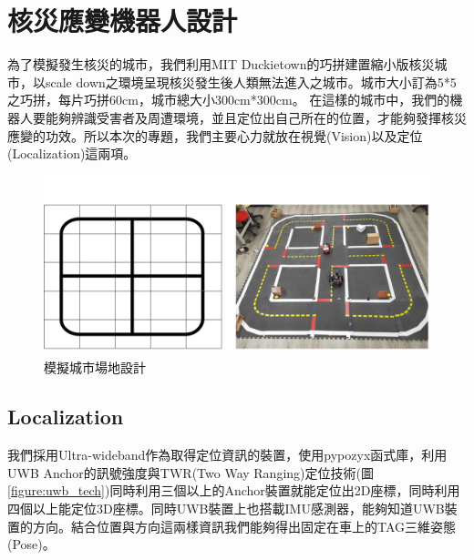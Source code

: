 \section{核災應變機器人設計}
為了模擬發生核災的城市，我們利用MIT Duckietown的巧拼建置縮小版核災城市，以scale down之環境呈現核災發生後人類無法進入之城市。城市大小訂為5*5之巧拼，每片巧拼60cm，城市總大小300cm*300cm。
在這樣的城市中，我們的機器人要能夠辨識受害者及周遭環境，並且定位出自己所在的位置，才能夠發揮核災應變的功效。所以本次的專題，我們主要心力就放在視覺(Vision)以及定位(Localization)這兩項。

\begin{figure}[t]
  \centering
    \includegraphics[width=\columnwidth]{images/field.png}
        \caption{模擬城市場地設計}
 \label{figure:field}
\end{figure}

\subsection{Localization}
我們採用Ultra-wideband作為取得定位資訊的裝置，使用pypozyx函式庫，利用UWB Anchor的訊號強度與TWR(Two Way Ranging)定位技術(圖\ref{figure:uwb_tech})同時利用三個以上的Anchor裝置就能定位出2D座標，同時利用四個以上能定位3D座標。同時UWB裝置上也搭載IMU感測器，能夠知道UWB裝置的方向。結合位置與方向這兩樣資訊我們能夠得出固定在車上的TAG三維姿態(Pose)。

